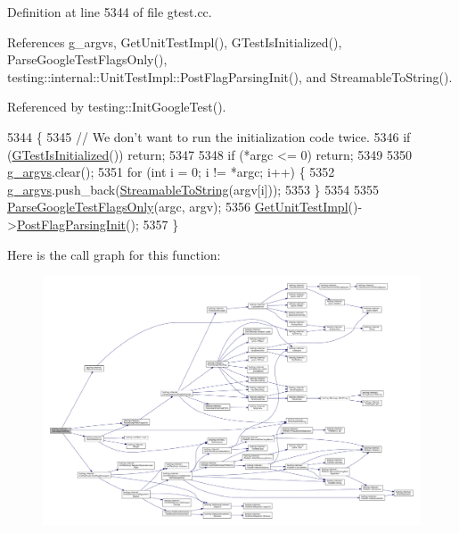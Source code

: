 Definition at line 5344 of file gtest.\+cc.



References g\+\_\+argvs, Get\+Unit\+Test\+Impl(), G\+Test\+Is\+Initialized(), Parse\+Google\+Test\+Flags\+Only(), testing\+::internal\+::\+Unit\+Test\+Impl\+::\+Post\+Flag\+Parsing\+Init(), and Streamable\+To\+String().



Referenced by testing\+::\+Init\+Google\+Test().


\begin{DoxyCode}
5344                                                     \{
5345   \textcolor{comment}{// We don't want to run the initialization code twice.}
5346   \textcolor{keywordflow}{if} (\hyperlink{namespacetesting_1_1internal_a91e707e0d371fae0224ffd37f0d042af}{GTestIsInitialized}()) \textcolor{keywordflow}{return};
5347 
5348   \textcolor{keywordflow}{if} (*argc <= 0) \textcolor{keywordflow}{return};
5349 
5350   \hyperlink{namespacetesting_1_1internal_ab7fe90df4f87f1bd8a244b0be2ccad79}{g\_argvs}.clear();
5351   \textcolor{keywordflow}{for} (\textcolor{keywordtype}{int} i = 0; i != *argc; i++) \{
5352     \hyperlink{namespacetesting_1_1internal_ab7fe90df4f87f1bd8a244b0be2ccad79}{g\_argvs}.push\_back(\hyperlink{namespacetesting_1_1internal_aad4beed95d0846e6ffc5da0978ef3bb9}{StreamableToString}(argv[i]));
5353   \}
5354 
5355   \hyperlink{namespacetesting_1_1internal_a472880afbcc592a41e3d623e2dec8412}{ParseGoogleTestFlagsOnly}(argc, argv);
5356   \hyperlink{namespacetesting_1_1internal_a9bd0caf5d16512de38b39599c13ee634}{GetUnitTestImpl}()->\hyperlink{classtesting_1_1internal_1_1UnitTestImpl_a772894193104b1b2516f16e6ff813168}{PostFlagParsingInit}();
5357 \}
\end{DoxyCode}
Here is the call graph for this function\+:
\nopagebreak
\begin{figure}[H]
\begin{center}
\leavevmode
\includegraphics[width=350pt]{namespacetesting_1_1internal_ac3c6fa93391768aa91c6238b31aaeeb5_cgraph}
\end{center}
\end{figure}
